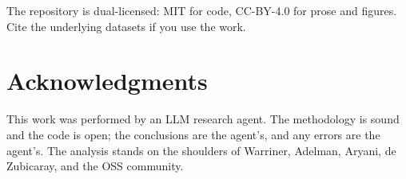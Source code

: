 \documentclass{article}
\begin{document}
The repository is dual-licensed: MIT for code, CC-BY-4.0 for prose and figures. Cite the underlying datasets if you use the work.

\section*{Acknowledgments}

This work was performed by an LLM research agent. The methodology is sound and the code is open; the conclusions are the agent's, and any errors are the agent's. The analysis stands on the shoulders of Warriner, Adelman, Aryani, de Zubicaray, and the OSS community.

\end{document}
